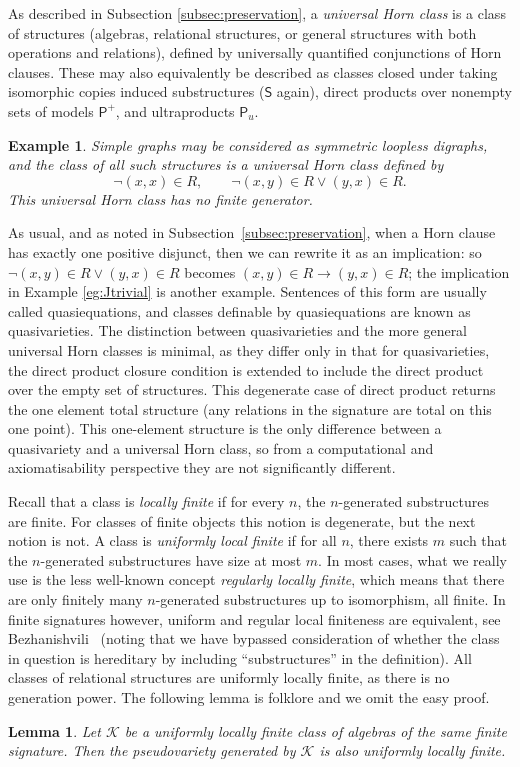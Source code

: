 \documentclass[10pt,a4paper]{amsart}
\theoremstyle{plain}
\newtheorem{lem}[thm]{Lemma}
\newtheorem{example}[thm]{Example}
\theoremstyle{definition}
\begin{document}
  
As described in Subsection \ref{subsec:preservation}, a \emph{universal Horn class} is a class of structures (algebras, relational structures, or general structures with both operations and relations), defined by universally quantified conjunctions of Horn clauses.
These may also equivalently be described as classes closed under taking  isomorphic copies induced substructures ($\mathsf{S}$ again), direct products over nonempty sets of models $\mathsf{P}^+$, and ultraproducts $\mathsf{P}_u$.
\begin{example}
Simple graphs may be considered as symmetric loopless digraphs, and the class of all such structures is a universal Horn class defined by 
\[
\neg (x,x)\in R,\qquad \neg (x,y)\in R\vee (y,x)\in R.
\]
This universal Horn class has no finite generator.
\end{example}
As usual, and as noted in Subsection~\ref{subsec:preservation}, when a Horn clause has exactly one positive disjunct, then we can rewrite it as an implication: so $\neg (x,y)\in R\vee (y,x)\in R$ becomes $(x,y)\in R\rightarrow (y,x)\in R$; the implication in Example \ref{eg:Jtrivial} is another example.  
Sentences of this form are usually called quasiequations, and classes definable by quasiequations are known as quasivarieties.
The distinction between quasivarieties and the more general universal Horn classes is minimal, as they differ only in that for quasivarieties, the direct product closure condition is extended to include the direct product over the empty set of structures.
This degenerate case of direct product returns the one element total structure (any relations in the signature are total on this one point).  
This one-element structure is the only difference between a quasivariety and a universal Horn class, so from a computational and axiomatisability perspective they are not significantly different.

Recall that a class is \emph{locally finite} if for every $n$, the $n$-generated substructures are finite.  
For classes of finite objects this notion is degenerate, but the next notion is not.
A class is \emph{uniformly local finite} if for all $n$, there exists $m$ such that the $n$-generated substructures have size at most $m$.  
In most cases, what we really use is the less well-known concept \emph{regularly locally finite}, which means that there are only finitely many $n$-generated substructures up to isomorphism, all finite.  In finite signatures however, uniform and regular local finiteness are equivalent, see Bezhanishvili~\cite{bez} (noting that we have bypassed consideration of whether the class in question is hereditary by including ``substructures'' in the definition).
All classes of relational structures are uniformly locally finite, as there is no generation power.  
The following lemma is folklore and we omit the easy proof.
\begin{lem}
Let $\mathscr{K}$ be a uniformly locally finite class of algebras of the same finite signature.  
Then the pseudovariety generated by $\mathscr{K}$ is also uniformly locally finite.
\end{lem}
\end{document}
